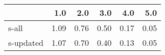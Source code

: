 \begin{tabular}{lrrrrr}
\toprule
{} &  1.0 &  2.0 &  3.0 &  4.0 &  5.0 \\
\midrule
s-all     & 1.09 & 0.76 & 0.50 & 0.17 & 0.05 \\
s-updated & 1.07 & 0.70 & 0.40 & 0.13 & 0.05 \\
\bottomrule
\end{tabular}
